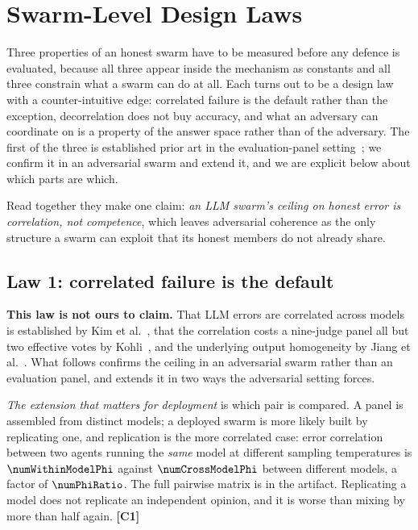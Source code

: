 \section{Swarm-Level Design Laws}
\label{sec:designlaws}

Three properties of an honest swarm have to be measured before any defence is
evaluated, because all three appear inside the mechanism as constants and all
three constrain what a swarm can do at all. Each turns out to be a design law
with a counter-intuitive edge: correlated failure is the default rather than the
exception, decorrelation does not buy accuracy, and what an adversary can
coordinate on is a property of the answer space rather than of the adversary.
The first of the three is established prior art in the evaluation-panel
setting~\cite{judgecorr,panelcorr,hivemind}; we confirm it in an adversarial
swarm and extend it, and we are explicit below about which parts are which.

Read together they make one claim: \emph{an LLM swarm's ceiling on honest error
is correlation, not competence}, which leaves adversarial coherence as the only
structure a swarm can exploit that its honest members do not already share.

\subsection{Law 1: correlated failure is the default}

\textbf{This law is not ours to claim.} That LLM errors are correlated across
models is established by Kim et al.~\cite{judgecorr}, that the correlation costs
a nine-judge panel all but two effective votes by Kohli~\cite{panelcorr}, and the
underlying output homogeneity by Jiang et al.~\cite{hivemind}. What follows
confirms the ceiling in an adversarial swarm rather than an evaluation panel, and
extends it in two ways the adversarial setting forces.

\emph{The extension that matters for deployment} is which pair is compared. A
panel is assembled from distinct models; a deployed swarm is more likely built by
replicating one, and replication is the more correlated case: error correlation
between two agents running the \emph{same} model at different sampling
temperatures is $\numWithinModelPhi$ against $\numCrossModelPhi$ between
different models, a factor of $\numPhiRatio$. The full pairwise matrix is in the
artifact. Replicating a model does not replicate an independent opinion, and it
is worse than mixing by more than half again. \textbf{[C1]}

